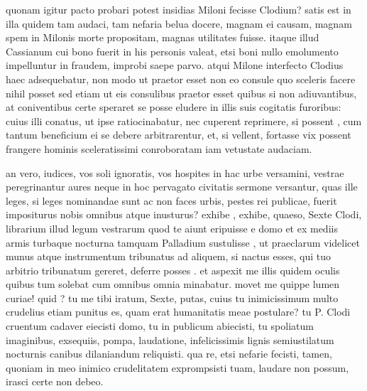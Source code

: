  quonam igitur pacto probari potest insidias Miloni fecisse Clodium? satis est in illa quidem tam audaci, tam nefaria belua docere, magnam ei causam, magnam spem in Milonis morte propositam, magnas utilitates fuisse. itaque illud Cassianum cui bono fuerit in his personis valeat, etsi boni nullo emolumento impelluntur in fraudem, improbi saepe parvo. atqui Milone interfecto Clodius haec adsequebatur, non modo ut praetor esset non eo consule quo sceleris facere nihil posset sed etiam ut eis consulibus praetor esset quibus si non adiuvantibus, at coniventibus certe speraret se posse eludere in illis suis cogitatis furoribus: cuius illi conatus, ut ipse ratiocinabatur, nec cuperent reprimere, si possent , cum tantum beneficium ei se debere arbitrarentur, et, si vellent, fortasse vix possent frangere hominis sceleratissimi conroboratam iam vetustate audaciam.

 an vero, iudices, vos soli ignoratis, vos hospites in hac urbe versamini, vestrae peregrinantur aures neque in hoc pervagato civitatis sermone versantur, quas ille leges, si leges nominandae sunt ac non faces urbis, pestes rei publicae, fuerit impositurus nobis omnibus atque inusturus? exhibe , exhibe, quaeso, Sexte Clodi, librarium illud legum vestrarum quod te aiunt eripuisse e domo et ex mediis armis turbaque nocturna tamquam Palladium sustulisse , ut praeclarum videlicet munus atque instrumentum tribunatus ad aliquem, si nactus esses, qui tuo arbitrio tribunatum gereret, deferre posses . et aspexit me illis quidem oculis quibus tum solebat cum omnibus omnia minabatur. movet me quippe lumen curiae! quid ? tu me tibi iratum, Sexte, putas, cuius tu inimicissimum multo crudelius etiam punitus es, quam erat humanitatis meae postulare? tu P. Clodi cruentum cadaver eiecisti domo, tu in publicum abiecisti, tu spoliatum imaginibus, exsequiis, pompa, laudatione, infelicissimis lignis semiustilatum nocturnis canibus dilaniandum reliquisti. qua re, etsi nefarie fecisti, tamen, quoniam in meo inimico crudelitatem exprompsisti tuam, laudare non possum, irasci certe non debeo.

